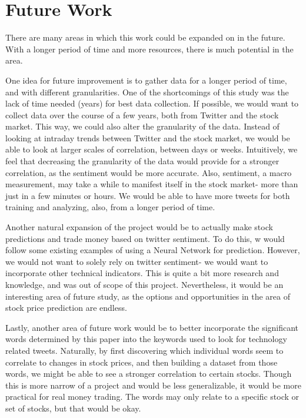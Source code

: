 \documentclass[preprint,pre,floats,aps,amsmath,amssymb,12pt]{revtex4}
\begin{document}
\section{Future Work}
\label{sec:future}
There are many areas in which this work could be expanded on in the future. With a longer period of time and more resources, there is much potential in the area. 

One idea for future improvement is to gather data for a longer period of time, and with different granularities. One of the shortcomings of this study was the lack of time needed (years) for best data collection. If possible, we would want to collect data over the course of a few years, both from Twitter and the stock market. This way, we could also alter the granularity of the data. Instead of looking at intraday trends between Twitter and the stock market, we would be able to look at larger scales of correlation, between days or weeks. Intuitively, we feel that decreasing the granularity of the data would provide for a stronger correlation, as the sentiment would be more accurate. Also, sentiment, a macro measurement, may take a while to manifest itself in the stock market- more than just in a few minutes or hours. We would be able to have more tweets for both training and analyzing, also, from a longer period of time. 

Another natural expansion of the project would be to actually make stock predictions and trade money based on twitter sentiment. To do this, w would follow some existing examples of using a Neural Network for prediction. However, we would not want to solely rely on twitter sentiment- we would want to incorporate other technical indicators. This is quite a bit more research and knowledge, and was out of scope of this project. Nevertheless, it would be an interesting area of future study, as the options and opportunities in the area of stock price prediction are endless. 

Lastly, another area of future work would be to better incorporate the significant words determined by this paper into the keywords used to look for technology related tweets. Naturally, by first discovering which individual words seem to correlate to changes in stock prices, and then building a dataset from those words, we might be able to see a stronger correlation to certain stocks. Though this is more narrow of a project and would be less generalizable, it would be more practical for real money trading. The words may only relate to a specific stock or set of stocks, but that would be okay. 
\end{document}
